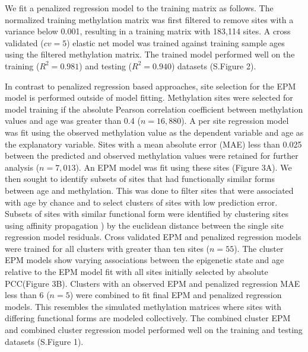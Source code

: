 \documentclass{article}
\begin{document}
{\begin{linenumbers}
We fit a penalized regression model to the training matrix as follows. The normalized training methylation matrix was 
first filtered to remove sites with a variance below 0.001, resulting in a training matrix with 183,114 sites. A 
cross validated ($cv=5$) elastic net model was trained against training sample ages using the filtered methylation 
matrix. The trained model performed well on the training ($R^2=0.981$) and testing ($R^2=0.940$) datasets (S.Figure 2). 

In contrast to penalized regression based approaches, site selection for the EPM model is performed outside of model 
fitting. Methylation sites were selected for model training if the absolute Pearson correlation coefficient between 
methylation values and age was greater than 0.4 ($n=16,880$). A per site regression model was fit using the observed 
methylation value as the dependent variable and age as the explanatory variable. Sites with a mean absolute error 
(MAE) less than 0.025 between the predicted and observed methylation values were retained for further analysis 
($n=7,013$). An EPM model was fit using these sites (Figure 3A). We then sought to identify subsets of sites that 
had functionally similar forms between age and methylation. This was done to filter sites that were associated with 
age by chance and to select clusters of sites with low prediction error. Subsets of sites with similar functional form 
were identified by clustering sites using affinity propagation \cite{Frey2007-mu}) by the euclidean distance between 
the single site regression model residuals. Cross validated EPM and penalized regression models were trained for all 
clusters with greater than ten sites ($n=55$). The cluster EPM models show varying associations between the epigenetic 
state and age relative to the EPM model fit with all sites initially selected by absolute PCC(Figure 3B). Clusters 
with an observed EPM and penalized regression MAE less than 6 ($n=5$) were combined to fit final EPM and penalized 
regression models. This resembles the simulated methylation matrices where sites with differing functional forms are 
modeled collectively. The combined cluster EPM and combined cluster regression model performed well on the training 
and testing datasets (S.Figure 1). 


\end{linenumbers}}
\end{document}

